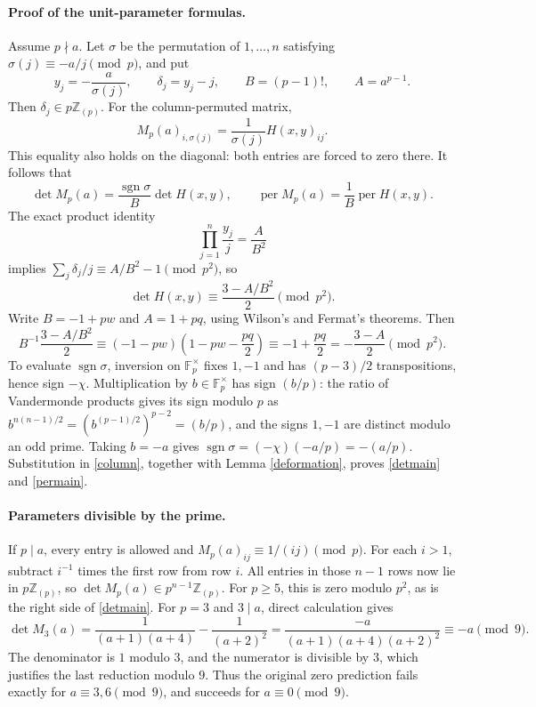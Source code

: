 \documentclass[11pt]{article}
\DeclareMathOperator{\per}{per}
\DeclareMathOperator{\sgn}{sgn}
\newcommand{\Fp}{\mathbb F_p}
\newcommand{\Zp}{\mathbb Z_{(p)}}
\begin{document}
\paragraph{Proof of the unit-parameter formulas.}
Assume $p\nmid a$. Let $\sigma$ be the permutation of $1,\ldots,n$
satisfying $\sigma(j)\equiv-a/j\pmod p$, and put
\[
 y_j=-\frac a{\sigma(j)},\qquad \delta_j=y_j-j,\qquad
 B=(p-1)!,\qquad A=a^{p-1}.
\]
Then $\delta_j\in p\Zp$. For the column-permuted matrix,
\[
 M_p(a)_{i,\sigma(j)}=\frac1{\sigma(j)}H(x,y)_{ij}.
\]
This equality also holds on the diagonal: both entries are forced to
zero there. It follows that
\begin{equation}
 \det M_p(a)=\frac{\sgn\sigma}{B}\det H(x,y),\qquad
 \per M_p(a)=\frac1B\per H(x,y).\label{column}
\end{equation}
The exact product identity
\[
 \prod_{j=1}^n\frac{y_j}{j}=\frac{A}{B^2}
\]
implies $\sum_j\delta_j/j\equiv A/B^2-1\pmod{p^2}$, so
\[
 \det H(x,y)\equiv\frac{3-A/B^2}{2}\pmod{p^2}.
\]
Write $B=-1+pw$ and $A=1+pq$, using Wilson's and Fermat's theorems.
Then
\[
 B^{-1}\frac{3-A/B^2}{2}
 \equiv(-1-pw)\left(1-pw-\frac{pq}{2}\right)
 \equiv-1+\frac{pq}{2}
 =-\frac{3-A}{2}\pmod{p^2}.\label{cancel}
\]
To evaluate $\sgn\sigma$, inversion on $\Fp^\times$ fixes $1,-1$
and has $(p-3)/2$ transpositions, hence sign $-\chi$.
Multiplication by $b\in\Fp^\times$ has sign $(b/p)$:
the ratio of Vandermonde products gives its sign modulo $p$ as
$b^{n(n-1)/2}=(b^{(p-1)/2})^{p-2}=(b/p)$, and the signs
$1,-1$ are distinct modulo an odd prime.
Taking $b=-a$ gives
$\sgn\sigma=(-\chi)(-a/p)=-(a/p)$.
Substitution in \eqref{column}, together with
Lemma \ref{deformation}, proves \eqref{detmain} and \eqref{permain}.

\paragraph{Parameters divisible by the prime.}
If $p\mid a$, every entry is allowed and
$M_p(a)_{ij}\equiv1/(ij)\pmod p$.
For each $i>1$, subtract $i^{-1}$ times the first row from row $i$.
All entries in those $n-1$ rows now lie in $p\Zp$, so
$\det M_p(a)\in p^{n-1}\Zp$. For $p\geq5$, this is zero modulo $p^2$,
as is the right side of \eqref{detmain}.
For $p=3$ and $3\mid a$, direct calculation gives
\[
 \det M_3(a)=
 \frac1{(a+1)(a+4)}-\frac1{(a+2)^2}
 =\frac{-a}{(a+1)(a+4)(a+2)^2}
 \equiv-a\pmod9.
\]
The denominator is $1$ modulo $3$, and the numerator is divisible by
$3$, which justifies the last reduction modulo $9$.
Thus the original zero prediction fails exactly for
$a\equiv3,6\pmod9$, and succeeds for $a\equiv0\pmod9$.
\end{document}

